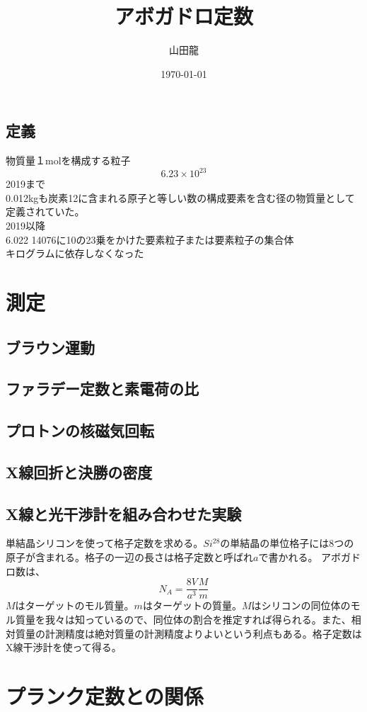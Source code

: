\documentclass{jsarticle}
\date{\today}
\author{山田龍}
\title{アボガドロ定数}
\newcommand{\beq}{\begin{equation}}
\newcommand{\eeq}{\end{equation}}
\begin{document}
\maketitle
\subsection{定義}

物質量１molを構成する粒子
\beq
6.23 \times 10^{23}
\eeq
2019まで\\
0.012kgも炭素12に含まれる原子と等しい数の構成要素を含む径の物質量として定義されていた。\\
2019以降\\
6.022 14076に10の23乗をかけた要素粒子または要素粒子の集合体\\
キログラムに依存しなくなった
\section{測定}
\subsection{ブラウン運動}
\subsection{ファラデー定数と素電荷の比}
\subsection{プロトンの核磁気回転}
\subsection{X線回折と決勝の密度}
\subsection{X線と光干渉計を組み合わせた実験}
単結晶シリコンを使って格子定数を求める。$Si^{28}$の単結晶の単位格子には8つの原子が含まれる。格子の一辺の長さは格子定数と呼ばれ$a$で書かれる。
アボガドロ数は、
\beq
    N_A = \frac{8V}{a^3} \frac{M}{m}
\eeq
$M$はターゲットのモル質量。$m$はターゲットの質量。$M$はシリコンの同位体のモル質量を我々は知っているので、同位体の割合を推定すれば得られる。また、相対質量の計測精度は絶対質量の計測精度よりよいという利点もある。格子定数はX線干渉計を使って得る。
\section{プランク定数との関係}
\end{document}
